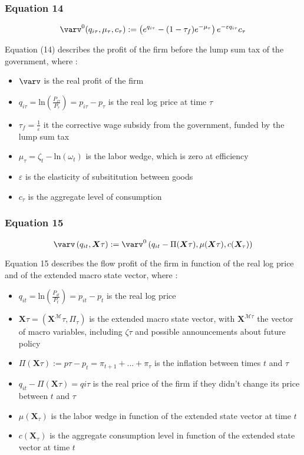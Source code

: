 \documentclass{article}
\begin{document}
\subsubsection*{Equation 14}
\begin{equation}
    \varv^{0}(q_{i\tau},\mu_{\tau},c_{\tau}):=\left(e^{q_{i\tau}}-(1-\tau_{f})e^{-\mu_{\tau}}\right)e^{-\varepsilon q_{i\tau}}c_{\tau}
\end{equation}

Equation (14) describes the profit of the firm before the lump sum tax of the government, where : 
\begin{itemize}
    \item $\varv$ is the real profit of the firm
    \item $q_{i\tau}=\text{ln}\left(\frac{P_{i\tau}}{P_{\tau}}\right)=p_{i\tau}-p_{\tau}$ is the real log price at time $\tau$
    \item $\tau_f=\frac{1}{\varepsilon}$ it the corrective wage subsidy from the government, funded by the lump sum tax
    \item $\mu_{\tau}=\zeta_{t}-\text{ln}(\omega_{t})$ is the labor wedge, which is zero at efficiency
    \item $\varepsilon$ is the elasticity of subsititution between goods
    \item $c_{\tau}$ is the aggregate level of consumption
\end{itemize}

\subsubsection*{Equation 15}
\begin{equation}
    \varv\left(q_{it},\bm{X}{\tau}\right):=\varv^{0}\left(q_{it}-\Pi(\bm{X}{\tau}),\mu(\bm{X}{\tau}),c(\bm{X}_{\tau})\right)
\end{equation}

Equation 15 describes the flow profit of the firm in function of the real log price and of the extended macro state vector, where : 
\begin{itemize}
    \item $q_{it}=\text{ln}\left(\frac{P_{it}}{P_{t}}\right)=p_{it}-p_{t}$ is the real log price
    \item $\bm{X}{\tau}=(\bm{X}^{\mathcal{M}}{\tau}, \Pi_{\tau})$ is the extended macro state vector, with $\bm{X}^{\mathcal{M}{\tau}}$ the vector of macro variables, including $\zeta{\tau}$ and possible announcements about future policy
    \item $\Pi\left(\bm{X}{\tau}\right):=p{\tau}-p_{t}=\pi_{t+1}+...+\pi_{\tau}$ is the inflation between times $t$ and $\tau$
    \item $q_{it}-\Pi(\bm{X}{\tau})=q{i\tau}$ is the real price of the firm if they didn't change its price between $t$ and $\tau$
    \item $\mu\left(\bm{X}_{\tau}\right)$ is the labor wedge in function of the extended state vector at time $t$
    \item $c(\bm{X}_{\tau})$ is the aggregate consumption level in function of the extended state vector at time $t$
\end{itemize}
\end{document}

